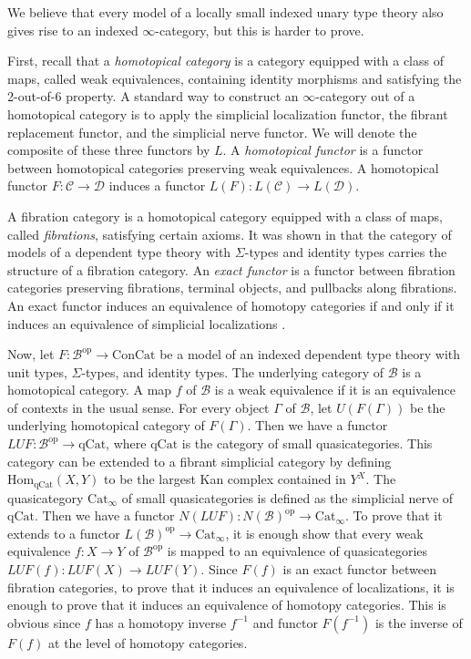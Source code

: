 \documentclass[reqno]{mscs}
\newcommand{\fs}[1]{\mathrm{#1}}
\newcommand{\cat}[1]{\mathcal{#1}}
\newcommand{\Hom}{\fs{Hom}}
\newcommand{\qCat}{\fs{qCat}}
\numberwithin{figure}{section}
\begin{document}
\begin{remark}
We believe that every model of a locally small indexed unary type theory also gives rise to an indexed $\infty$-category, but this is harder to prove.
\end{remark}

First, recall that a \emph{homotopical category} is a category equipped with a class of maps, called weak equivalences, containing identity morphisms and satisfying the 2-out-of-6 property.
A standard way to construct an $\infty$-category out of a homotopical category is to apply the simplicial localization functor, the fibrant replacement functor, and the simplicial nerve functor.
We will denote the composite of these three functors by $L$.
A \emph{homotopical functor} is a functor between homotopical categories preserving weak equivalences.
A homotopical functor $F : \cat{C} \to \cat{D}$ induces a functor $L(F) : L(\cat{C}) \to L(\cat{D})$.

A fibration category is a homotopical category equipped with a class of maps, called \emph{fibrations}, satisfying certain axioms.
It was shown in \cite{tt-fibr-cat} that the category of models of a dependent type theory with $\Sigma$-types and identity types carries the structure of a fibration category.
An \emph{exact functor} is a functor between fibration categories preserving fibrations, terminal objects, and pullbacks along fibrations.
An exact functor induces an equivalence of homotopy categories if and only if it induces an equivalence of simplicial localizations \cite[Th\'eor\`eme~3.25]{cis10b}.

Now, let $F : \cat{B}^\fs{op} \to \fs{ConCat}$ be a model of an indexed dependent type theory with unit types, $\Sigma$-types, and identity types.
The underlying category of $\cat{B}$ is a homotopical category.
A map $f$ of $\cat{B}$ is a weak equivalence if it is an equivalence of contexts in the usual sense.
For every object $\Gamma$ of $\cat{B}$, let $U(F(\Gamma))$ be the underlying homotopical category of $F(\Gamma)$.
Then we have a functor $LUF : \cat{B}^\fs{op} \to \qCat$, where $\qCat$ is the category of small quasicategories.
This category can be extended to a fibrant simplicial category by defining $\Hom_\qCat(X,Y)$ to be the largest Kan complex contained in $Y^X$.
The quasicategory $\fs{Cat}_\infty$ of small quasicategories is defined as the simplicial nerve of $\qCat$.
Then we have a functor $N(LUF) : N(\cat{B})^\fs{op} \to \fs{Cat}_\infty$.
To prove that it extends to a functor $L(\cat{B})^\fs{op} \to \fs{Cat}_\infty$, it is enough show that every weak equivalence $f : X \to Y$ of $\cat{B}^\fs{op}$ is mapped to an equivalence of quasicategories $LUF(f) : LUF(X) \to LUF(Y)$.
Since $F(f)$ is an exact functor between fibration categories, to prove that it induces an equivalence of localizations, it is enough to prove that it induces an equivalence of homotopy categories.
This is obvious since $f$ has a homotopy inverse $f^{-1}$ and functor $F(f^{-1})$ is the inverse of $F(f)$ at the level of homotopy categories.
\end{document}
